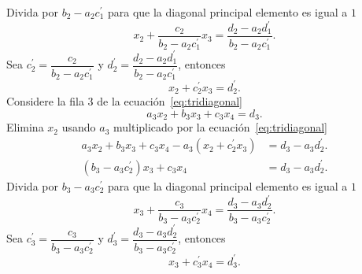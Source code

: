 \begin{frame}
	\frametitle{\insertsection}

	Divida por $b_{2}-a_{2}c^{\prime}_{1}$ para que la diagonal
	principal elemento es igual a $1$
	\begin{equation*}
		x_{2}+
		\frac{c_{2}}{b_{2}-a_{2}c^{\prime}_{1}}x_{3}=
		\frac{d_{2}-a_{2}d^{\prime}_{1}}{b_{2}-a_{2}c^{\prime}_{1}}.
	\end{equation*}
	Sea $c^{\prime}_{2}=\dfrac{c_{2}}{b_{2}-a_{2}c^{\prime}_{1}}$ y
	\begin{math}
		d^{\prime}_{2}=
		\dfrac{d_{2}-a_{2}d^{\prime}_{1}}{b_{2}-a_{2}c^{\prime}_{1}}
	\end{math},
	entonces
	\begin{equation*}
		x_{2}+
		c^{\prime}_{2}x_{3}=
		d^{\prime}_{2}.
	\end{equation*}
	Considere la fila 3 de la ecuación~\eqref{eq:tridiagonal}
	\begin{equation*}
		a_{3}x_{2}+
		b_{3}x_{3}+
		c_{3}x_{4}=
		d_{3}.
	\end{equation*}
	Elimina $x_{2}$ usando $a_{3}$ multiplicado por la
	ecuación~\eqref{eq:tridiagonal}
	\begin{align*}
		a_{3}x_{2}+
		b_{3}x_{3}+
		c_{3}x_{4}-
		a_{3}\left(x_{2}+c^{\prime}_{2}x_{3}\right) & =
		d_{3}-a_{3}d^{\prime}_{2}.                      \\
		\left(b_{3}-a_{3}c^{\prime}_{2}\right)x_{3}+
		c_{3}x_{4}                                  & =
		d_{3}-a_{3}d^{\prime}_{2}.
	\end{align*}
	Divida por $b_{3}-a_{3}c^{\prime}_{2}$ para que la diagonal principal
	elemento es igual a $1$
	\begin{equation*}
		x_{3}+
		\frac{c_{3}}{b_{3}-a_{3}c^{\prime}_{2}}x_{4}=
		\frac{d_{3}-a_{3}d^{\prime}_{2}}{b_{3}-a_{3}c^{\prime}_{2}}.
	\end{equation*}
	Sea $c^{\prime}_{3}=\dfrac{c_{3}}{b_{3}-a_{3}c^{\prime}_{2}}$ y
	\begin{math}
		d^{\prime}_{3}=
		\dfrac{d_{3}-a_{3}d^{\prime}_{2}}{b_{3}-a_{3}c^{\prime}_{2}}
	\end{math},
	entonces
	\begin{equation*}
		x_{3}+c^{\prime}_{3}x_{4}=
		d^{\prime}_{3}.
	\end{equation*}
\end{frame}

